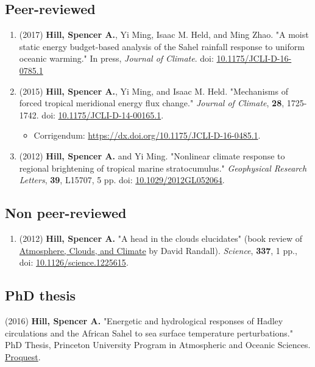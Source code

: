 \documentclass[12pt,letterpaper]{shillcv}
\begin{document}
\subsection*{Peer-reviewed}
\label{sec:orgdb92e70}
\begin{enumerate}
\item (2017) \textbf{Hill, Spencer A.}, Yi Ming, Isaac M. Held, and Ming Zhao.  "A moist
static energy budget-based analysis of the Sahel rainfall response to uniform
oceanic warming."  In press, \emph{Journal of Climate}.  doi: \href{https://doi.org/10.1175/JCLI-D-16-0785.1}{10.1175/JCLI-D-16-0785.1}
\item (2015) \textbf{Hill, Spencer A.}, Yi Ming, and Isaac M. Held. "Mechanisms of forced
tropical meridional energy flux change."  \emph{Journal of Climate}, \textbf{28}, 1725-1742.
doi: \href{http://dx.doi.org/10.1175/JCLI-D-14-00165.1}{10.1175/JCLI-D-14-00165.1}.
\begin{itemize}
\item Corrigendum: \url{https://dx.doi.org/10.1175/JCLI-D-16-0485.1}.
\end{itemize}
\item (2012) \textbf{Hill, Spencer A.} and Yi Ming. "Nonlinear climate response to regional
brightening of tropical marine stratocumulus."  \emph{Geophysical Research Letters},
\textbf{39}, L15707, 5 pp. doi:
\href{http://dx.doi.org/10.1029/2012GL052064}{10.1029/2012GL052064}.
\end{enumerate}
\subsection*{Non peer-reviewed}
\label{sec:orgd4e4e21}
\begin{enumerate}
\item (2012) \textbf{Hill, Spencer A.} "A head in the clouds elucidates" (book review of
\href{http://press.princeton.edu/titles/9773.html}{Atmosphere, Clouds, and Climate} by David Randall). \emph{Science}, \textbf{337}, 1 pp., doi: \href{http://dx.doi.org/10.1126/science.1225615}{10.1126/science.1225615}.
\end{enumerate}
\subsection*{PhD thesis}
\label{sec:orgba9b947}
(2016) \textbf{Hill, Spencer A.} "Energetic and hydrological responses of Hadley circulations and the African Sahel to sea surface temperature perturbations."  PhD Thesis, Princeton University Program in Atmospheric and Oceanic Sciences.  \href{http://search.proquest.com.ezproxy.princeton.edu/pqdtglobal/docview/1831357756/abstract/522E2D42A8BF49C0PQ/1}{Proquest}.
\end{document}
